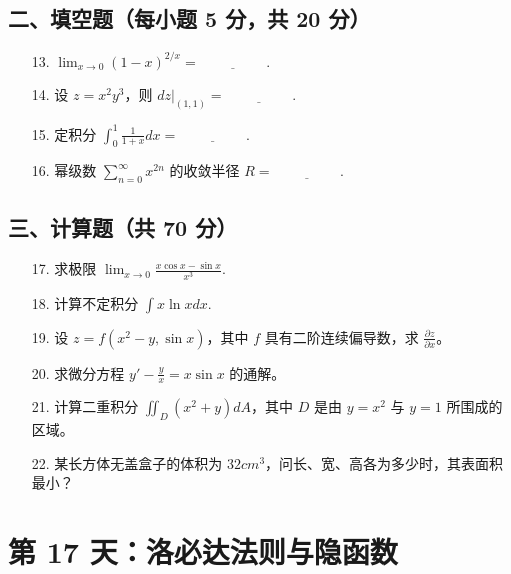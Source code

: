 \documentclass[11pt,a4paper]{article}
\begin{document}
\subsection*{二、填空题（每小题 5 分，共 20 分）}
\begin{enumerate}
    \item[13.] $\lim_{x \to 0} (1-x)^{2/x} = \underline{\hspace{2cm}}$.
    \item[14.] 设 $z = x^2 y^3$，则 $dz|_{(1,1)} = \underline{\hspace{2cm}}$.
    \item[15.] 定积分 $\int_0^1 \frac{1}{1+x} dx = \underline{\hspace{2cm}}$.
    \item[16.] 幂级数 $\sum_{n=0}^{\infty} x^{2n}$ 的收敛半径 $R = \underline{\hspace{2cm}}$.
\end{enumerate}
\subsection*{三、计算题（共 70 分）}
\begin{enumerate}
    \item[17.] 求极限 $\lim_{x \to 0} \frac{x \cos x - \sin x}{x^3}$.
    \item[18.] 计算不定积分 $\int x \ln x dx$.
    \item[19.] 设 $z = f(x^2-y, \sin x)$，其中 $f$ 具有二阶连续偏导数，求 $\frac{\partial z}{\partial x}$。
    \item[20.] 求微分方程 $y' - \frac{y}{x} = x \sin x$ 的通解。
    \item[21.] 计算二重积分 $\iint_D (x^2+y) dA$，其中 $D$ 是由 $y=x^2$ 与 $y=1$ 所围成的区域。
    \item[22.] 某长方体无盖盒子的体积为 $32 cm^3$，问长、宽、高各为多少时，其表面积最小？
\end{enumerate}

\newpage

\section*{第 17 天：洛必达法则与隐函数}
\end{document}
